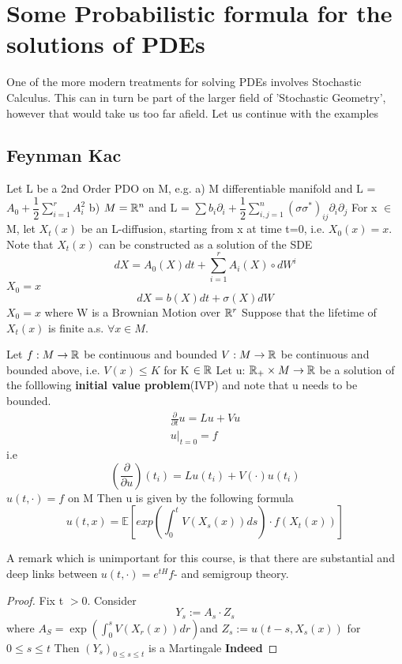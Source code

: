 \section{Some Probabilistic formula for the solutions of PDEs}
One of the more modern treatments for solving PDEs involves Stochastic Calculus. This can in turn be part of the 
larger field of 'Stochastic Geometry', however that would take us too far afield. 
Let us continue with the examples
\subsection{Feynman Kac}
Let L be a 2nd Order PDO on M, 
e.g. a) M differentiable manifold and L = $A_0 + \dfrac{1}{2} \sum_{i=1}^{r} A^{2}_{i}$
b) $M = \mathbb{R}^n$ and L = $\sum b_i \partial_i +
 \dfrac{1}{2} \sum_{i,j=1}^{n} (\sigma \sigma^{*})_{ij} \partial_i \partial_j$
For x $\in$ M, let $X_t(x)$ be an L-diffusion, starting from x at time t=0, i.e. $X_{0}(x) = x$.
Note that $X_t(x)$ can be constructed as a solution of the SDE
\begin{equation}\label{SDE_1}
 dX = A_0 (X) dt + \sum_{i=1}^{r}A_{i}(X)\circ dW^{i}
\end{equation}
$X_0 = x$
\begin{equation}\label{SDE_2}
 dX = b(X) dt + \sigma(X) dW
\end{equation}
$X_0 = x$
where W is a Brownian Motion over $\mathbb{R}^{r}$
Suppose that the lifetime of $X_t(x)$ is finite a.s. $\forall x \in M$.
\begin{prop}
Let $f:M \to \mathbb{R}$ be continuous and bounded
    $V: M \to \mathbb{R}$ be continuous and bounded above, i.e. $V(x) \leq K$ for K $\in \mathbb{R}$
 Let u: $\mathbb{R}_+ \times M \to \mathbb{R}$ be a solution of the folllowing \textbf{initial value problem}(IVP) and note that
u needs to be bounded. 
\begin{align}
 \frac{\partial}{\partial t} u = Lu + Vu
\\ u|_{t=0} = f
\end{align}
i.e 
\begin{equation}
  (\frac{\partial}{\partial u}) (t_i) = Lu(t_i) + V(\cdot)u(t_i)
\end{equation}
$u(t, \cdot) = f$ on M
Then u is given by the following formula 
$$u(t,x) = \mathbb{E}[exp(\int_{0}^{t}V(X_{s}(x))ds)\cdot f(X_{t}(x))]$$

\end{prop}

\begin{rem}
 A remark which is unimportant for this course, is that there are substantial and deep links between $u(t,\cdot)= 
e^{tH}f$- and semigroup theory. 
\end{rem}
\begin{proof}
 Fix t $>$0. Consider 
\begin{equation}
 Y_{s}:= A_s \cdot Z_s
\end{equation}
where $A_S = \exp(\int_{0}^{s} V(X_r(x))dr)$and $Z_s:= u(t-s,X_s(x))$ for $0 \leq s \leq t$
Then $(Y_s)_{0\leq s \leq t}$ is a Martingale
\textbf{Indeed}
\end{proof}
